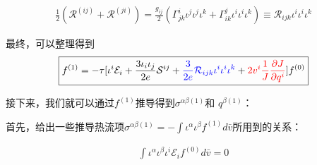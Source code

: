 \documentclass[LBMDerivation.tex]{subfiles}
\begin{document}
\begin{equation}
  \begin{gathered}
    \frac{1}{2}(\mathcal{R}^{(ij)}+\mathcal{R}^{(ji)})=\frac{g_{ij}}{2}(\Gamma_{jk}^i \iota^j\iota^j\iota^k + \Gamma_{ik}^j \iota^i\iota^i\iota^k )  \equiv \mathcal{R}_{ijk} \iota^i\iota^i\iota^k
  \end{gathered}
\end{equation}










最终，可以整理得到
\begin{equation}
  \boxed{
    \begin{gathered}
      f^{(1)}=
      -\tau [ \iota^i\mathcal{E}_i
      +\frac{3\iota_i \iota_j}{2e} \mathcal{S}^{ij}
      + {\color{blue} \frac{3}{2e} \mathcal{R}_{ijk} \iota^i\iota^i\iota^k} + {\color{red} 2v^i  \frac{1}{J}\frac{\partial J}{\partial q^i}}
      ]{f^{(0)}}
    \end{gathered}
  }
\end{equation}





接下来，我们就可以通过$f^{(1)}$推导得到$\sigma^{\alpha\beta(1)}$和 $q^{\beta (1)}$：


首先，给出一些推导热流项$ \sigma^{\alpha\beta(1)}=-\int \iota^{\alpha} \iota^{\beta} f^{(1)}  d \bar{v}$所用到的关系：

\begin{equation}
  \begin{gathered}
    \int \iota^\alpha \iota^\beta \iota^i \mathcal{E}_i f^{(0)} d \bar{v}=0
  \end{gathered}
\end{equation}
\end{document}
